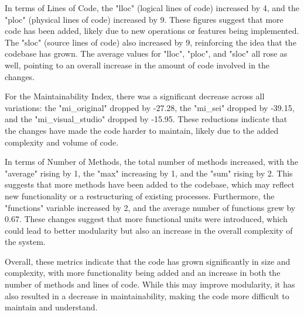 In terms of Lines of Code, the "lloc" (logical lines of code) increased by 4, and the "ploc" (physical lines of code) increased by 9. These figures suggest that more code has been added, likely due to new operations or features being implemented. The "sloc" (source lines of code) also increased by 9, reinforcing the idea that the codebase has grown. The average values for "lloc", "ploc", and "sloc" all rose as well, pointing to an overall increase in the amount of code involved in the changes.

For the Maintainability Index, there was a significant decrease across all variations: the "mi\_original" dropped by -27.28, the "mi\_sei" dropped by -39.15, and the "mi\_visual\_studio" dropped by -15.95. These reductions indicate that the changes have made the code harder to maintain, likely due to the added complexity and volume of code.

In terms of Number of Methods, the total number of methods increased, with the "average" rising by 1, the "max" increasing by 1, and the "sum" rising by 2. This suggests that more methods have been added to the codebase, which may reflect new functionality or a restructuring of existing processes. Furthermore, the "functions" variable increased by 2, and the average number of functions grew by 0.67. These changes suggest that more functional units were introduced, which could lead to better modularity but also an increase in the overall complexity of the system.

Overall, these metrics indicate that the code has grown significantly in size and complexity, with more functionality being added and an increase in both the number of methods and lines of code. While this may improve modularity, it has also resulted in a decrease in maintainability, making the code more difficult to maintain and understand.
